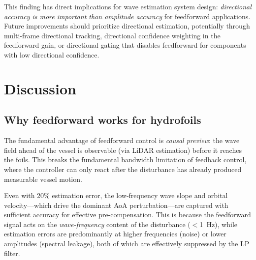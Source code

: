\documentclass[review]{elsarticle}
\begin{document}
This finding has direct implications for wave estimation system design:
\emph{directional accuracy is more important than amplitude accuracy}
for feedforward applications.
Future improvements should prioritize directional estimation, potentially
through multi-frame directional tracking, directional confidence weighting
in the feedforward gain, or directional gating that disables feedforward
for components with low directional confidence.

\section{Discussion}
\label{sec:discussion}

\subsection{Why feedforward works for hydrofoils}

The fundamental advantage of feedforward control is \emph{causal
preview}: the wave field ahead of the vessel is observable
(via LiDAR estimation) before it reaches the foils.
This breaks the fundamental bandwidth limitation of feedback control,
where the controller can only react after the disturbance has already
produced measurable vessel motion.

Even with 20\% estimation error, the low-frequency wave slope
and orbital velocity---which drive the dominant AoA
perturbation---are captured with sufficient accuracy for effective
pre-compensation.
This is because the feedforward signal acts on the
\emph{wave-frequency} content of the disturbance ($<$1~Hz), while
estimation errors are predominantly at higher frequencies (noise)
or lower amplitudes (spectral leakage), both of which are
effectively suppressed by the LP filter.
\end{document}
